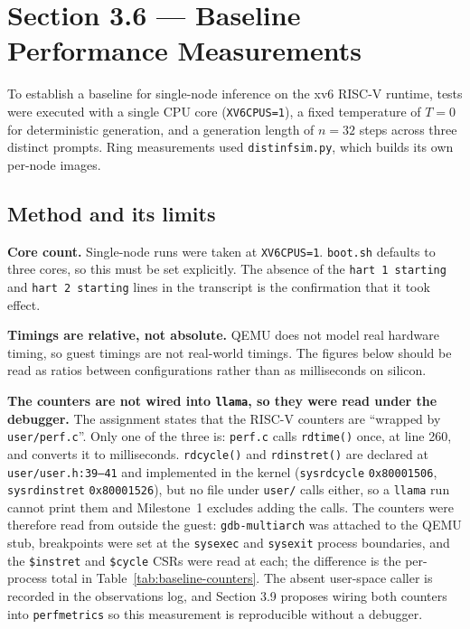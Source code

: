 \documentclass[11pt]{article}
\renewcommand{\_}{\origunderscore\allowbreak}
\begin{document}
\section*{Section 3.6 --- Baseline Performance Measurements}

To establish a baseline for single-node inference on the xv6 RISC-V runtime, tests were executed with a single CPU core (\texttt{XV6\_CPUS=1}), a fixed temperature of $T=0$ for deterministic generation, and a generation length of $n = 32$ steps across three distinct prompts. Ring measurements used \texttt{distinf\_sim.py}, which builds its own per-node images.

\subsection*{Method and its limits}

\textbf{Core count.} Single-node runs were taken at \texttt{XV6\_CPUS=1}. \texttt{boot.sh} defaults to three cores, so this must be set explicitly. The absence of the \texttt{hart 1 starting} and \texttt{hart 2 starting} lines in the transcript is the confirmation that it took effect.

\textbf{Timings are relative, not absolute.} QEMU does not model real hardware timing, so guest timings are not real-world timings. The figures below should be read as ratios between configurations rather than as milliseconds on silicon.

\textbf{The counters are not wired into \texttt{llama}, so they were read under the debugger.} The assignment states that the RISC-V counters are ``wrapped by \texttt{user/perf.c}''. Only one of the three is: \texttt{perf.c} calls \texttt{rdtime()} once, at line 260, and converts it to milliseconds. \texttt{rdcycle()} and \texttt{rdinstret()} are declared at \texttt{user/user.h:39--41} and implemented in the kernel (\texttt{sys\_rdcycle} \texttt{0x80001506}, \texttt{sys\_rdinstret} \texttt{0x80001526}), but no file under \texttt{user/} calls either, so a \texttt{llama} run cannot print them and Milestone~1 excludes adding the calls. The counters were therefore read from outside the guest: \texttt{gdb-multiarch} was attached to the QEMU stub, breakpoints were set at the \texttt{sys\_exec} and \texttt{sys\_exit} process boundaries, and the \texttt{\$instret} and \texttt{\$cycle} CSRs were read at each; the difference is the per-process total in Table~\ref{tab:baseline-counters}. The absent user-space caller is recorded in the observations log, and Section 3.9 proposes wiring both counters into \texttt{perf\_metrics} so this measurement is reproducible without a debugger.
\end{document}
